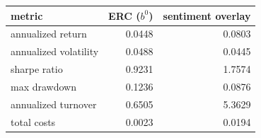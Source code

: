 \begin{tabular}{@{}lrr@{}}
\toprule
metric & ERC ($b^0$) & sentiment overlay \\
\midrule
annualized return & 0.0448 & 0.0803 \\
annualized volatility & 0.0488 & 0.0445 \\
sharpe ratio & 0.9231 & 1.7574 \\
max drawdown & 0.1236 & 0.0876 \\
annualized turnover & 0.6505 & 5.3629 \\
total costs & 0.0023 & 0.0194 \\
\bottomrule
\end{tabular}
